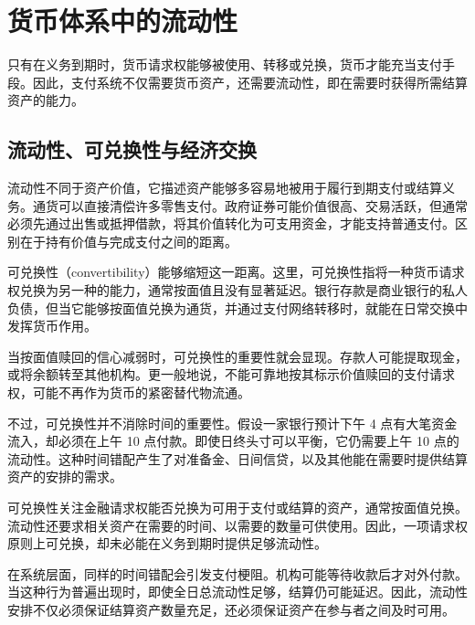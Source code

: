 \section{货币体系中的流动性}

只有在义务到期时，货币请求权能够被使用、转移或兑换，货币才能充当支付手段。因此，支付系统不仅需要货币资产，还需要流动性，即在需要时获得所需结算资产的能力。

\subsection{流动性、可兑换性与经济交换}

流动性不同于资产价值，它描述资产能够多容易地被用于履行到期支付或结算义务。通货可以直接清偿许多零售支付。政府证券可能价值很高、交易活跃，但通常必须先通过出售或抵押借款，将其价值转化为可支用资金，才能支持普通支付。区别在于持有价值与完成支付之间的距离。

可兑换性（convertibility）能够缩短这一距离。这里，可兑换性指将一种货币请求权兑换为另一种的能力，通常按面值且没有显著延迟。银行存款是商业银行的私人负债，但当它能够按面值兑换为通货，并通过支付网络转移时，就能在日常交换中发挥货币作用。

当按面值赎回的信心减弱时，可兑换性的重要性就会显现。存款人可能提取现金，或将余额转至其他机构。更一般地说，不能可靠地按其标示价值赎回的支付请求权，可能不再作为货币的紧密替代物流通。

不过，可兑换性并不消除时间的重要性。假设一家银行预计下午 4 点有大笔资金流入，却必须在上午 10 点付款。即使日终头寸可以平衡，它仍需要上午 10 点的流动性。这种时间错配产生了对准备金、日间信贷，以及其他能在需要时提供结算资产的安排的需求。


\begin{tcolorbox}[
  enhanced,
  breakable,
  colback=white,
  colframe=FinanceBlue,
  boxrule=0.7pt,
  sharp corners,
  borderline west={2.2pt}{0pt}{FinanceBlue},
  title=\textbf{金融视角：可兑换性与流动性},
  coltitle=white,
  colbacktitle=FinanceBlue,
  fonttitle=\bfseries,
  before skip=1.2em,
  after skip=1.2em
]
可兑换性关注金融请求权能否兑换为可用于支付或结算的资产，通常按面值兑换。流动性还要求相关资产在需要的时间、以需要的数量可供使用。因此，一项请求权原则上可兑换，却未必能在义务到期时提供足够流动性。
\end{tcolorbox}

在系统层面，同样的时间错配会引发支付梗阻。机构可能等待收款后才对外付款。当这种行为普遍出现时，即使全日总流动性足够，结算仍可能延迟。因此，流动性安排不仅必须保证结算资产数量充足，还必须保证资产在参与者之间及时可用。

